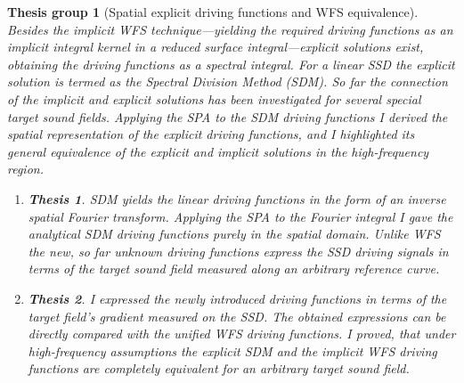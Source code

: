 \documentclass[10pt,twoside]{article}
\theoremstyle{thesisgroupstyle}
\newtheorem{thesisgroup}{Thesis group}
\newtheorem{thesis}{Thesis}[thesisgroup]
\begin{document}
\begin{thesisgroup}[Spatial explicit driving functions and WFS equivalence]
Besides the implicit WFS technique---yielding the required driving functions as an implicit integral kernel in a reduced surface integral---explicit solutions exist, obtaining the driving functions as a spectral integral.
For a linear SSD the explicit solution is termed as the \emph{Spectral Division Method (SDM)}.
So far the connection of the implicit and explicit solutions has been investigated for several special target sound fields.
Applying the SPA to the SDM driving functions I derived the spatial representation of the explicit driving functions, and I highlighted its general equivalence of the explicit and implicit solutions in the high-frequency region.
\begin{enumerate}
\item[] \vspace{-7mm}\begin{thesis}SDM yields the linear driving functions in the form of an inverse spatial Fourier transform.
Applying the SPA to the Fourier integral I gave the analytical SDM driving functions purely in the spatial domain.
Unlike WFS the new, so far unknown driving functions express the SSD driving signals in terms of the target sound field measured along an arbitrary reference curve.\end{thesis}
\item[] \vspace{-7mm}\begin{thesis}I expressed the newly introduced driving functions in terms of the target field's gradient measured on the SSD.
The obtained expressions can be directly compared with the unified WFS driving functions.
I proved, that under high-frequency assumptions the explicit SDM and the implicit WFS driving functions are completely equivalent for an arbitrary target sound field.\end{thesis}
\end{enumerate}
\end{thesisgroup}
\end{document}
